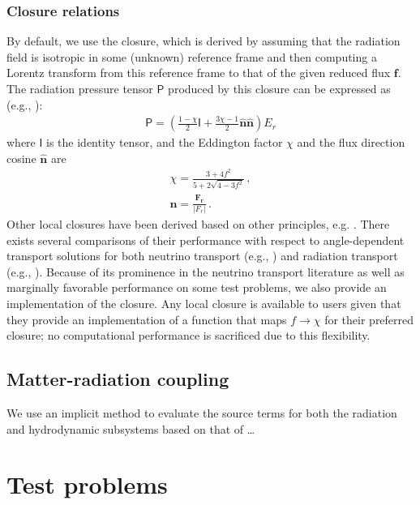 \documentclass[fleqn,usenatbib]{mnras}
\begin{document}
\subsubsection{Closure relations}
By default, we use the \cite{Levermore_1984} closure, which is derived by assuming that the radiation field is isotropic in some (unknown) reference frame and then computing a Lorentz transform from this reference frame to that of the given reduced flux $\mathbf{f}$. The radiation pressure tensor $\mathsf{P}$ produced by this closure can be expressed as (e.g., \citealt{Gonzalez_2007,Rosdahl_2013,Skinner_2013}):
\begin{align}
\mathsf{P} = \left( \frac{1 - \chi}{2} \mathsf{I} + \frac{3\chi - 1}{2} \mathbf{\hat n} \mathbf{\hat n} \right) E_r
\end{align}
where $\mathsf{I}$ is the identity tensor, and the Eddington factor $\chi$ and the flux direction cosine $\mathbf{\hat n}$ are
\begin{align}
\chi = \frac{3 + 4f^2}{5 + 2 \sqrt{4 - 3 f^2}} \, , \\
\mathbf{\hat n} = \frac{\mathbf{F_r}}{|F_r|} \, .
\end{align}
Other local closures have been derived based on other principles, e.g. \cite{Minerbo_1978,Levermore_1981}. There exists several comparisons of their performance with respect to angle-dependent transport solutions for both neutrino transport (e.g., \citealt{Janka_1992,Koerner_1992}) and radiation transport (e.g., \citealt{Olson_2000}). Because of its prominence in the neutrino transport literature as well as marginally favorable performance on some test problems, we also provide an implementation of the \cite{Minerbo_1978} closure. Any local closure is available to users given that they provide an implementation of a function that maps $f \rightarrow \chi$ for their preferred closure; no computational performance is sacrificed due to this flexibility.

\subsection{Matter-radiation coupling}
We use an implicit method to evaluate the source terms for both the radiation and hydrodynamic subsystems based on that of \cite{Howell_2003}\dots

\section{Test problems}
\label{section:tests}
\end{document}
